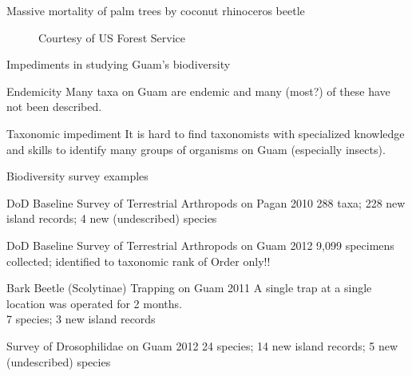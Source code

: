 \documentclass[]{beamer}
\begin{document}
\begin{frame}{Massive mortality of palm trees by coconut rhinoceros beetle}
	\begin{figure}
		\begin{minipage}[t]{.48\textwidth}
            \tiny{Courtesy of US Forest Service}
		\end{minipage}
		\begin{minipage}[t]{0.48\textwidth}
		\end{minipage}
	\end{figure} 
\end{frame}


\begin{frame}{Impediments in studying Guam's biodiversity}
   
    \begin{block}{Endemicity}
        Many taxa on Guam are endemic and many (most?) of these have not been described.
    \end{block}
    
    \begin{block}{Taxonomic impediment}
    	It is hard to find taxonomists with specialized knowledge and skills to identify many groups of organisms on Guam (especially insects). 
    \end{block}
    
\end{frame}{}


\begin{frame}{Biodiversity survey examples}

    \begin{block}{DoD Baseline Survey of Terrestrial Arthropods on Pagan 2010}
     288 taxa; 228 new island records; 4 new (undescribed) species
    \end{block}
    
    \begin{block}{DoD Baseline Survey of Terrestrial Arthropods on Guam 2012}
    9,099 specimens collected; identified to taxonomic rank of Order only!!
    \end{block}
    
    \begin{block}{Bark Beetle (Scolytinae) Trapping on Guam 2011}
    A single trap at a single location was operated for 2 months.\\
    7 species; 3 new island records
    \end{block}
    
    \begin{block}{Survey of Drosophilidae on Guam 2012}
    24 species; 14 new island records; 5 new (undescribed) species
    \end{block}
    
\end{frame}
\end{document}
